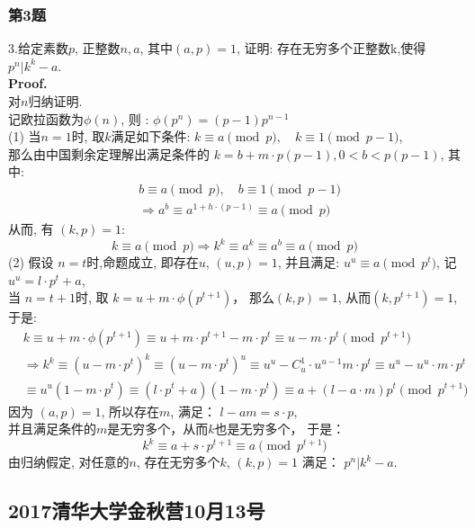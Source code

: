 \documentclass[UTF8]{article}
\begin{document}
\subsubsection{第3题}
\noindent 3.给定素数$p$, 正整数$n,a$, 其中$(a,p)=1$, 证明: 存在无穷多个正整数k,使得 $p^n|k^k-a$.\\
\textbf{Proof.}\\
对$n$归纳证明. \\
记欧拉函数为$\phi (n)$, 则 : $\phi (p^n) = (p-1)p^{n-1}$ \\
(1) 当$n=1$时, 取$k$满足如下条件: $k \equiv a \pmod p ,\quad	k \equiv 1 \pmod {p-1}$, \\
那么由中国剩余定理解出满足条件的 $k = b + m\cdot p(p-1) , 0<b < p(p-1)$, 其中: 
\begin{eqnarray*}
&	b \equiv a \pmod p ,\quad	b \equiv 1 \pmod {p-1} \\
&	\Longrightarrow a^b \equiv a^{1+h\cdot (p-1)} \equiv a \pmod p
\end{eqnarray*}
从而, 有 $(k,p)=1$:
$$k \equiv a \pmod p \Longrightarrow k^k \equiv a^k \equiv a^b \equiv a \pmod p$$ 
(2) 假设 $n=t$时,命题成立, 即存在$u$, $(u,p)=1$, 并且满足: $u^u \equiv a \pmod {p^t}$, 记 $u^u = l\cdot p^t + a$,\\
当 $n=t+1$时, 取 $k=u + m\cdot \phi (p^{t+1})$， 那么$(k,p)=1$, 从而$(k,p^{t+1}) =1$, 于是: 
\begin{eqnarray*}
	& k \equiv u+m\cdot \phi(p^{t+1}) \equiv u + m\cdot p^{t+1} - m\cdot p^t \equiv u-m\cdot p^t \pmod{p^{t+1}}\\
	&\Longrightarrow  k^k \equiv (u-m\cdot p^t)^k \equiv (u-m\cdot p^t)^u \equiv u^u -C_u^1\cdot u^{u-1} m\cdot p^t \equiv u^u - u^u\cdot m\cdot p^t \\
	& \equiv u^u(1-m\cdot p^t) \equiv (l\cdot p^t +a)(1-m\cdot p^t) \equiv a + (l-a\cdot m)p^t \pmod{p^{t+1}}
\end{eqnarray*}
因为 $(a,p)=1$, 所以存在$m$, 满足： $l-am=s\cdot p$, \\
并且满足条件的$m$是无穷多个，从而$k$也是无穷多个， 于是：
$$ k^k \equiv a + s\cdot p^{t+1} \equiv a \pmod {p^{t+1}}$$
由归纳假定, 对任意的$n$, 存在无穷多个$k$, $(k,p)=1$ 满足： $p^n|k^k-a$.

\subsection{2017清华大学金秋营10月13号}
\end{document}
